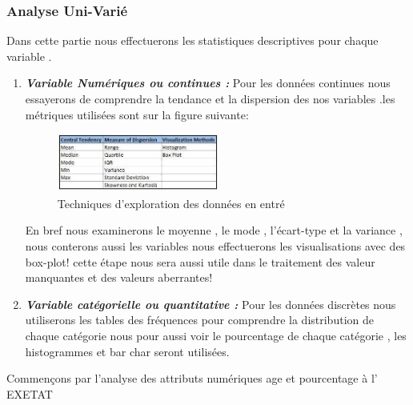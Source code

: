 \subsubsection{Analyse Uni-Varié}
Dans cette partie nous effectuerons les statistiques descriptives pour chaque variable .
\begin{enumerate}
	\item
	\emph{\textbf{Variable Numériques ou continues : }}Pour les données continues nous
	essayerons de comprendre la tendance et la dispersion des nos
	variables .les métriques utilisées sont sur la figure suivante: 
	\begin{figure}[ht]
		\centering
		\includegraphics[width=0.5\textwidth]{fig/DataExploration.png}
		\caption[Short caption]{Techniques d'exploration des données en entré }
		\label{fig:DataExplora}
	\end{figure}
	En bref nous examinerons le moyenne , le mode , l'écart-type et la
	variance , nous conterons aussi les variables nous effectuerons  les
	visualisations avec des box-plot! cette étape nous sera aussi utile
	dans le traitement des valeur manquantes et des valeurs aberrantes!
	\item
	\emph{\textbf{Variable catégorielle ou quantitative :}} Pour les données discrètes nous
	 utiliserons  les tables des fréquences pour comprendre la distribution de
	chaque catégorie nous pour aussi voir le pourcentage de chaque
	catégorie , les histogrammes et bar char seront utilisées.
\end{enumerate}
Commençons par l'analyse des attributs numériques age et pourcentage à l' \ac{EXETAT} 
